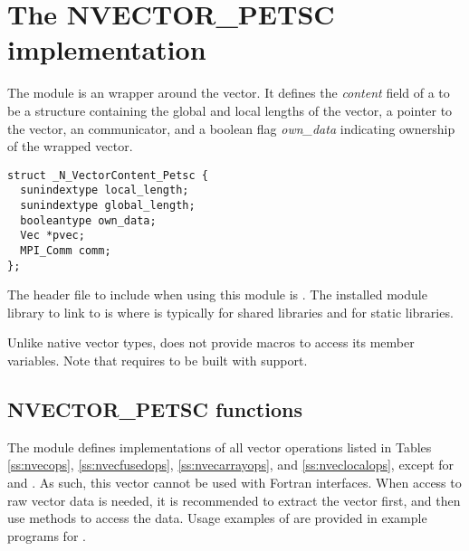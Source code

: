 %
\section{The NVECTOR\_PETSC implementation}\label{ss:nvec_petsc}

The {\nvecpetsc} module is an {\nvector} wrapper around the {\petsc} vector.
It defines the {\em content} field of a  to be a structure containing
the global and local lengths of the vector, a pointer to the {\petsc} vector,
an {\mpi} communicator, and a boolean flag {\em own\_data} indicating ownership of 
the wrapped {\petsc} vector.
\begin{verbatim} 
struct _N_VectorContent_Petsc {
  sunindextype local_length;
  sunindextype global_length;
  booleantype own_data;
  Vec *pvec;
  MPI_Comm comm;
};
\end{verbatim}
The header file to include when using this module is .
The installed module library to link to is
where  is typically  for shared libraries and 
for static libraries.

Unlike native {\sundials} vector types, {\nvecpetsc} does not provide macros 
to access its member variables.
Note that {\nvecpetsc} requires {\sundials} to be built with {\mpi} support.


\subsection{NVECTOR\_PETSC functions}
\label{ss:nvec_petsc_functions}

The {\nvecpetsc} module defines implementations of all vector operations listed 
in Tables \ref{ss:nvecops}, \ref{ss:nvecfusedops}, \ref{ss:nvecarrayops},
and \ref{ss:nveclocalops}, except for
 and . As such, this vector cannot be
used with {\sundials} Fortran interfaces.
When access to raw vector data is needed, it is 
recommended to extract the {\petsc} vector first, and then use {\petsc} 
methods to access the data. Usage examples of {\nvecpetsc} are provided in
example programs for {\ida} \cite{ida_ex}.

